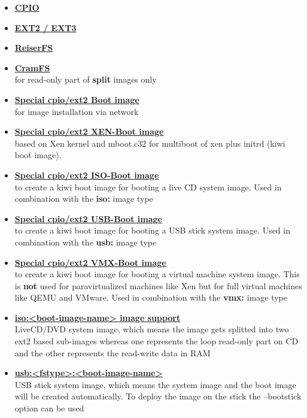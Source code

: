 \begin{itemize}
	\item \textbf{\underline{CPIO}}
	\item \textbf{\underline{EXT2 / EXT3}}
	\item \textbf{\underline{ReiserFS}}
	\item \textbf{\underline{CramFS}}\\
		  for read-only part of \textbf{split} images only
	\item \textbf{\underline{Special cpio/ext2 Boot image}}\\
          for image installation via network
	\item \textbf{\underline{Special cpio/ext2 XEN-Boot image}}\\
          based on Xen kernel and mboot.c32 for multiboot of xen plus
		  initrd (kiwi boot image).
	\item \textbf{\underline{Special cpio/ext2 ISO-Boot image}}\\
          to create a kiwi boot image for booting a live CD 
          system image. Used in combination with the \textbf{iso:}
          image type 
	\item \textbf{\underline{Special cpio/ext2 USB-Boot image}}\\
          to create a kiwi boot image for booting a USB stick
          system image. Used in combination with the
          \textbf{usb:} image type
	\item \textbf{\underline{Special cpio/ext2 VMX-Boot image}}\\
          to create a kiwi boot image for booting a virtual
          machine system image. This is \textbf{not} used for paravirtualized
	      machines like Xen but for full virtual machines like
          QEMU and VMware. Used in combination with the \textbf{vmx:}
          image type
	\item \textbf{\underline{iso:<boot-image-name> image support}}\\
          LiveCD/DVD system image, which means the image gets
          splitted into two ext2 based sub-images whereas one represents
          the loop read-only part on CD and the other represents the
          read-write data in RAM
	\item \textbf{\underline{usb:<fstype>:<boot-image-name>}}\\
          USB stick system image, which means the system image and
          the boot image will be created automatically. To deploy the
          image on the stick the --bootstick option can be used

\end{itemize}
